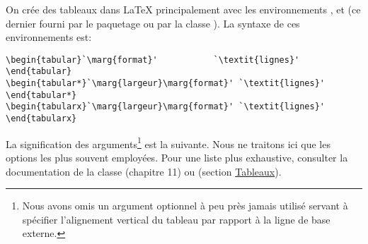On crée des tableaux dans {\LaTeX} principalement avec les
environnements ,  et  (ce
dernier fourni par le paquetage  ou par la classe
). La syntaxe de ces environnements est:
\begin{lstlisting}
\begin{tabular}`\marg{format}'           `\textit{lignes}' \end{tabular}
\begin{tabular*}`\marg{largeur}\marg{format}' `\textit{lignes}' \end{tabular*}
\begin{tabularx}`\marg{largeur}\marg{format}' `\textit{lignes}' \end{tabularx}
\end{lstlisting}
La signification des arguments\footnote{%
  Nous avons omis un argument optionnel à peu près jamais utilisé
  servant à spécifier l'alignement vertical du tableau par rapport à
  la ligne de base externe.} %
est la suivante. Nous ne traitons ici que les options les plus souvent
employées. Pour une liste plus exhaustive, consulter la documentation
de la classe  (chapitre 11) ou \cite{wikilivres:latex}
(section \href{http://fr.wikibooks.org/wiki/LaTeX/Tableaux}{Tableaux}).

